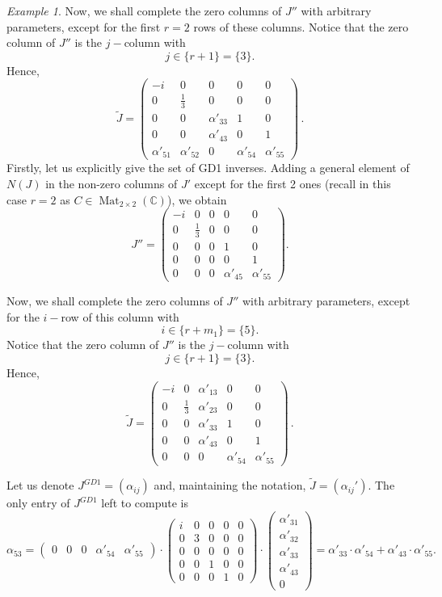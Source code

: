 \documentclass[10pt,a4paper]{amsart}
\theoremstyle{plain}
\theoremstyle{remark}
\newtheorem{exam}{Example}
\numberwithin{equation}{section} \numberwithin{defn}{section}
\newcommand{\Mat}{\operatorname{Mat}}
\newcommand{\C}{\mathbb{C}}
\begin{document}
\begin{exam}
 Now, we shall complete the zero columns of $J''$ with arbitrary parameters, except for the first $r=2$ rows of these columns. Notice that the zero column of $J''$ is the $j-$column with $$j\in \{r+1\}=\{3\} .$$ Hence, $$\tilde{J}= \begin{pmatrix}
-i & 0 & 0 & 0 & 0 \\
0 & \frac{1}{3} & 0 & 0 & 0 \\
0 & 0 & \alpha'_{33} & 1 & 0 \\
0 & 0 & \alpha'_{43} & 0 & 1 \\
\alpha'_{51} & \alpha'_{52} & 0 & \alpha'_{54} & \alpha'_{55}
\end{pmatrix}\, .$$
Firstly, let us explicitly give the set of GD1 inverses.
 Adding a general element of $N(J)$ in the non-zero columns of $J'$ except for the first 2 ones (recall in this case $r=2$ as $C\in \Mat_{2\times 2}(\C)$), we obtain $$J''= \begin{pmatrix}
-i & 0 & 0 & 0 & 0 \\
0 & \frac{1}{3} & 0 & 0 & 0 \\
0 & 0 & 0 & 1 & 0 \\
0 & 0 & 0 & 0 & 1 \\
0 & 0 & 0 & \alpha'_{45} & \alpha'_{55}
\end{pmatrix}.$$

 Now, we shall complete the zero columns of $J''$ with arbitrary parameters, except for the $i-$row of this column with $$i\in \{ r+m_{1}\}=\{5\}. $$ Notice that the zero column of $J''$ is the $j-$column with $$j\in \{r+1\}=\{3\} .$$ Hence, $$\tilde{J}= \begin{pmatrix}
-i & 0 & \alpha'_{13} & 0 & 0 \\
0 & \frac{1}{3} & \alpha'_{23} & 0 & 0 \\
0 & 0 & \alpha'_{33} & 1 & 0 \\
0 & 0 & \alpha'_{43} & 0 & 1 \\
0 & 0 & 0 & \alpha'_{54} & \alpha'_{55}
\end{pmatrix}\, .$$

 Let us denote $J^{GD1}=(\alpha_{ij})$ and, maintaining the notation, $\tilde{J}=(\alpha_{ij}').$ The only entry of $J^{GD1}$ left to compute is
$$\alpha_{53}=\begin{pmatrix}
0 & 0 & 0 & \alpha'_{54} & \alpha'_{55}
\end{pmatrix}\cdot \begin{pmatrix}
i & 0 & 0 & 0 & 0 \\
0 & 3 & 0 & 0 & 0 \\
0 & 0 & 0 & 0 & 0 \\
0 & 0 & 1 & 0 & 0 \\
0 & 0 & 0 & 1 & 0
\end{pmatrix} \cdot \left(\begin{matrix}
\alpha'_{31} \\
\alpha'_{32} \\
\alpha'_{33} \\
\alpha'_{43} \\
0
\end{matrix}\right)=\alpha'_{33}\cdot \alpha'_{54}+\alpha'_{43}\cdot \alpha'_{55}.$$ 
 


\end{exam}
\end{document}
